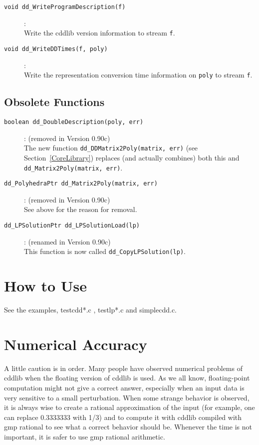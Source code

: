 \documentclass[11pt]{article}
\newcommand {\0} {{\bf 0}}
\begin{document}
\begin{description}
\item[{\tt void dd\_WriteProgramDescription(f)}]:\\
Write the cddlib version information to stream {\tt f}.

\item[{\tt void dd\_WriteDDTimes(f, poly)}]:\\
Write the representation conversion time information on {\tt poly}
 to stream {\tt f}.

\end{description}

\subsection{Obsolete Functions}  \label{ObsoleteFunctions}
\begin{description}
\item[{\tt boolean dd\_DoubleDescription(poly, err)}]: 
(removed in Version 0.90c)\\
The new function
{\tt dd\_DDMatrix2Poly(matrix, err)} (see Section~\ref{CoreLibrary}) 
replaces (and actually combines) both this and 
{\tt dd\_Matrix2Poly(matrix, err)}.

\item[{\tt dd\_PolyhedraPtr dd\_Matrix2Poly(matrix, err)}]: 
(removed in Version 0.90c)\\
See above for the reason for removal.

\item[{\tt dd\_LPSolutionPtr dd\_LPSolutionLoad(lp)}]:
(renamed in Version 0.90c)\\
This function is now called {\tt dd\_CopyLPSolution(lp)}.

\end{description}

\section{How to Use}  \label{HOWTO}

See the examples, testcdd*.c , testlp*.c and simplecdd.c.


\section{Numerical Accuracy}  \label{accuracy}
 A little caution is in order.  Many people have observed 
numerical problems of cddlib when the floating version of cddlib
is used.   As we all know, floating-point computation
might not give a correct answer, especially when an input
data is very sensitive to a small perturbation.  When
some strange behavior is observed, it is always wise
to create a rational approximation of the input
(for example, one can replace 0.3333333 with 1/3)
and to compute it with cddlib compiled with gmp rational
to see what a correct behavior should be.  Whenever the time
is not important, it is safer to use gmp rational arithmetic.
\end{document}
